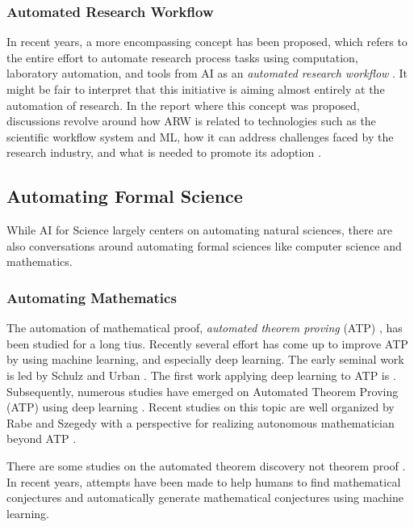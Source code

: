 \subsubsection{Automated Research Workflow}

In recent years, a more encompassing concept has been proposed, which refers to the entire effort to automate research process tasks using computation, laboratory automation, and tools from AI as an \textit{automated research workflow} \cite{national2022automated}. It might be fair to interpret that this initiative is aiming almost entirely at the automation of research. In the report where this concept was proposed, discussions revolve around how ARW is related to technologies such as the scientific workflow system and ML, how it can address challenges faced by the research industry, and what is needed to promote its adoption \cite{national2022automated}.


\subsection{Automating Formal Science}
While AI for Science largely centers on automating natural sciences, there are also conversations around automating formal sciences like computer science and mathematics.

\subsubsection{Automating Mathematics}
The automation of mathematical proof, \textit{automated theorem proving} (ATP) , has been studied for a long tius. Recently several effort has come up to improve ATP by using machine learning, and especially deep learning. The early seminal work is led by Schulz \cite{schulz2001learning} and Urban \cite{urban2004mptp,urban2008malarea}. The first work applying deep learning to ATP is \cite{irving2016deepmath}. Subsequently, numerous studies have emerged on Automated Theorem Proving (ATP) using deep learning \cite{bansal2019holist}. Recent studies on this topic are well organized by Rabe and Szegedy with a perspective for realizing autonomous mathematician beyond ATP \cite{rabe2021towards}.

There are some studies on the automated theorem discovery not theorem proof \cite{gao2014systematic}. In recent years, attempts have been made to help humans to find mathematical conjectures \cite{davies2021advancing} and
automatically generate mathematical conjectures \cite{raayoni2021generating,mishra2023mathematical}  using machine learning.


